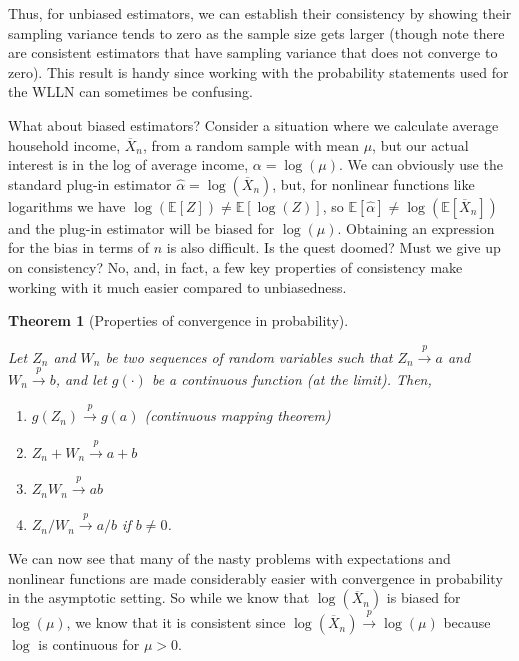\documentclass[
  13pt,
  letterpaper,
  DIV=11,
  numbers=noendperiod]{scrreprt}
\providecommand{\tightlist}{%
  \setlength{\itemsep}{0pt}\setlength{\parskip}{0pt}}
\newcommand{\E}{\mathbb{E}}
\newcommand{\Xbar}{\overline{X}}
\newcommand{\inprob}{\overset{p}{\to}}
\theoremstyle{plain}
\newtheorem{theorem}{Theorem}[chapter]
\theoremstyle{plain}
\theoremstyle{definition}
\theoremstyle{definition}
\theoremstyle{remark}
\begin{document}
Thus, for unbiased estimators, we can establish their consistency by
showing their sampling variance tends to zero as the sample size gets
larger (though note there are consistent estimators that have sampling
variance that does not converge to zero). This result is handy since
working with the probability statements used for the WLLN can sometimes
be confusing.

What about biased estimators? Consider a situation where we calculate
average household income, \(\Xbar_n\), from a random sample with mean
\(\mu\), but our actual interest is in the log of average income,
\(\alpha = \log(\mu)\). We can obviously use the standard plug-in
estimator \(\widehat{\alpha} = \log(\Xbar_n)\), but, for nonlinear
functions like logarithms we have
\(\log\left(\E[Z]\right) \neq \E[\log(Z)]\), so
\(\E[\widehat{\alpha}] \neq \log(\E[\Xbar_n])\) and the plug-in
estimator will be biased for \(\log(\mu)\). Obtaining an expression for
the bias in terms of \(n\) is also difficult. Is the quest doomed? Must
we give up on consistency? No, and, in fact, a few key properties of
consistency make working with it much easier compared to unbiasedness.

\begin{theorem}[Properties of convergence in
probability]\protect\hypertarget{thm-inprob-properties}{}\label{thm-inprob-properties}

Let \(Z_n\) and \(W_n\) be two sequences of random variables such that
\(Z_n \inprob a\) and \(W_n \inprob b\), and let \(g(\cdot)\) be a
continuous function (at the limit). Then,

\begin{enumerate}
\def\labelenumi{\arabic{enumi}.}
\tightlist
\item
  \(g(Z_n) \inprob g(a)\) (continuous mapping theorem)
\item
  \(Z_n + W_n \inprob a + b\)
\item
  \(Z_nW_n \inprob ab\)
\item
  \(Z_n/W_n \inprob a/b\) if \(b \neq 0\).
\end{enumerate}

\end{theorem}

We can now see that many of the nasty problems with expectations and
nonlinear functions are made considerably easier with convergence in
probability in the asymptotic setting. So while we know that
\(\log(\Xbar_n)\) is biased for \(\log(\mu)\), we know that it is
consistent since \(\log(\Xbar_n) \inprob \log(\mu)\) because \(\log\) is
continuous for \(\mu > 0\).
\end{document}
